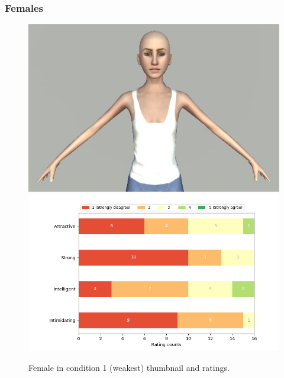 \subsubsection{Females}
\begin{figure}[H]
  \includegraphics[width=\linewidth]{Images/Females/10.JPG}
\endminipage\hfill
{}
  \includegraphics[width=\linewidth]{Survey/avatar_f_experiment1.png}
\endminipage\hfill
\caption{Female in condition 1 (weakest) thumbnail and ratings.}
\end{figure}

